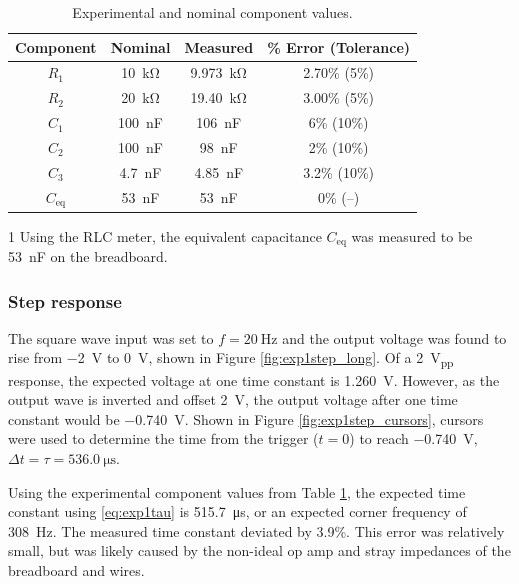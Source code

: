 \documentclass{report}
\newcommand{\pp}{_{pp}}
\newcommand{\Vpp}{\V\pp}
\begin{document}
	\begin{table}[h]
		\centering
		\caption{Experimental and nominal component values.}
		\label{table:lab1components}
		\begin{threeparttable}
			\begin{tabular}{cccc}
				\toprule
				Component & Nominal & Measured & \% Error (Tolerance) \\
				\midrule
				$R_1$ & \SI{10}{\kohm} & \SI{9.973}{\kohm} & 2.70\% (5\%) \\
				$R_2$ & \SI{20}{\kohm} & \SI{19.40}{\kohm} & 3.00\% (5\%) \\
				$C_1$ & \SI{100}{\nano\farad} & \SI{106}{\nano\farad} & 6\% (10\%) \\
				$C_2$ & \SI{100}{\nano\farad} & \SI{98}{\nano\farad} & 2\% (10\%) \\
				$C_3$ & \SI{4.7}{\nano\farad} & \SI{4.85}{\nano\farad} & 3.2\% (10\%) \\
				\midrule
				$C_\mathrm{eq}$\tnote{1} & \SI{53}{\nano\farad} & \SI{53}{\nano\farad} & 0\% (--) \\
				\bottomrule
			\end{tabular}
			\begin{tablenotes}
				\footnotesize
				\item[1] Using the RLC meter, the equivalent capacitance $C_\mathrm{eq}$ was measured to be \SI{53}{\nano\farad} on the breadboard.
			\end{tablenotes}
		\end{threeparttable}
	\end{table}

	\subsubsection{Step response}
	The square wave input was set to $f=\SI{20}{\Hz}$ and the output voltage was found to rise from \SI{-2}{\V} to \SI{0}{\V}, shown in Figure \ref{fig:exp1step_long}. Of a \SI{2}{\Vpp} response, the expected voltage at one time constant is \SI{1.260}{\V}. However, as the output wave is inverted and offset \SI{2}{\V}, the output voltage after one time constant would be \SI{-0.740}{\V}. Shown in Figure \ref{fig:exp1step_cursors}, cursors were used to determine the time from the trigger ($t=0$) to reach \SI{-0.740}{\V}, $\Delta t=\tau=\SI{536.0}{\us}$.
	
	Using the experimental component values from Table \ref{table:lab1components}, the expected time constant using \eqref{eq:exp1tau} is \SI{515.7}{\us}, or an expected corner frequency of \SI{308}{\Hz}. The measured time constant deviated by 3.9\%. This error was relatively small, but was likely caused by the non-ideal op amp and stray impedances of the breadboard and wires. 
\end{document}
